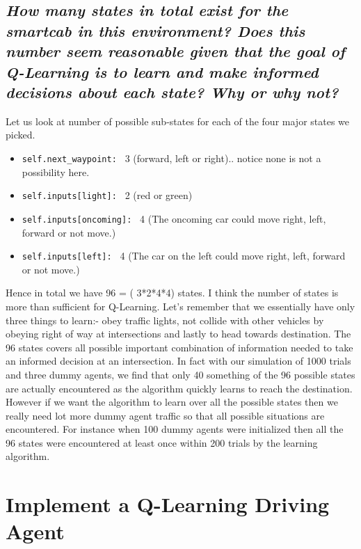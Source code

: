 \documentclass[paper=a4, fontsize=11pt]{scrartcl}
\numberwithin{equation}{section}		%
\numberwithin{figure}{section}			%
\numberwithin{table}{section}				%
\begin{document}
\subsection{\textit{How many states in total exist for the \textbf{smartcab} in this environment? Does this number seem reasonable given that the goal of Q-Learning is to learn and make informed decisions about each state? Why or why not?}}

	Let us look at number of possible sub-states for each of the four major states we picked.
\begin{itemize}
	\item   \texttt{self.next\_waypoint: } 3  (forward, left or right).. notice none is not a possibility here.
	\item   \texttt{self.inputs[\textquotesingle light\textquotesingle]: } 2 (red or green)
	\item   \texttt{self.inputs[\textquotesingle oncoming\textquotesingle]: } 4 (The oncoming car could move right, left, forward or not move.)
	\item   \texttt{self.inputs[\textquotesingle left\textquotesingle ]: }  4 (The car on the left could move right, left, forward or not move.)
\end{itemize}


Hence in total we have 96 = ( 3*2*4*4) states. I think the number of states is more than sufficient for Q-Learning. Let's remember that we essentially have only three things to learn:- obey traffic lights, not collide with other vehicles by obeying  right of way at intersections and lastly to head towards destination. The 96 states covers all possible important combination of information needed to take an informed decision at an intersection. In fact with our simulation of 1000 trials and three dummy agents, we find that only 40 something of the 96 possible states are actually encountered as the algorithm quickly learns to reach the destination. However if we want the algorithm to learn over all the possible states then we really need lot more dummy agent traffic so that all possible situations are encountered. For instance when 100 dummy agents were initialized then all the 96 states were encountered at least once within 200 trials by the learning algorithm.
 
 \pagebreak
\section{Implement a Q-Learning Driving Agent}
\end{document}
